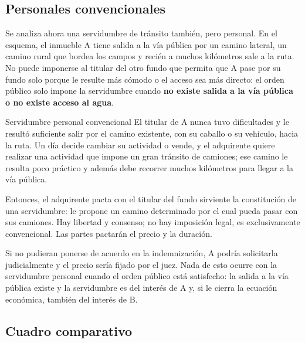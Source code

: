 \documentclass[12pt,oneside]{book}
\begin{document}
\subsection{Personales convencionales}

Se analiza ahora una servidumbre de tránsito también, pero personal. En el esquema, el inmueble A tiene salida a la vía pública por un camino lateral, un camino rural que bordea los campos y recién a muchos kilómetros sale a la ruta. No puede imponerse al titular del otro fundo que permita que A pase por su fundo solo porque le resulte más cómodo o el acceso sea más directo: el orden público solo impone la servidumbre cuando \textbf{no existe salida a la vía pública o no existe acceso al agua}.

\begin{ejemplo}{Servidumbre personal convencional}
El titular de A nunca tuvo dificultades y le resultó suficiente salir por el camino existente, con su caballo o su vehículo, hacia la ruta. Un día decide cambiar su actividad o vende, y el adquirente quiere realizar una actividad que impone un gran tránsito de camiones; ese camino le resulta poco práctico y además debe recorrer muchos kilómetros para llegar a la vía pública.

Entonces, el adquirente pacta con el titular del fundo sirviente la constitución de una servidumbre: le propone un camino determinado por el cual pueda pasar con sus camiones. Hay libertad y consenso; no hay imposición legal, es exclusivamente convencional. Las partes pactarán el precio y la duración.

Si no pudieran ponerse de acuerdo en la indemnización, A podría solicitarla judicialmente y el precio sería fijado por el juez. Nada de esto ocurre con la servidumbre personal cuando el orden público está satisfecho: la salida a la vía pública existe y la servidumbre es del interés de A y, si le cierra la ecuación económica, también del interés de B.
\end{ejemplo}

\subsection{Cuadro comparativo}
\end{document}
